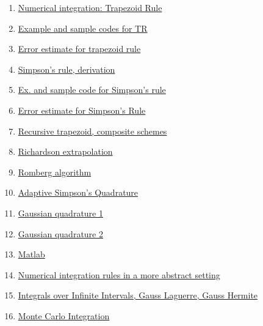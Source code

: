 \documentclass[11pt]{article}
\begin{document}
\begin{multicols}{2}
	\begin{enumerate}
		\item \href{https://mp.weixin.qq.com/s/n0nvErfrI6dky09jLMUrQw}{Numerical integration: Trapezoid Rule}	%
		\item \href{https://mp.weixin.qq.com/s/OZSXY4VVAWWYm0ZGQwIfSw}{Example and sample codes for TR}	%
		\item \href{https://mp.weixin.qq.com/s/HWJass--DbZm6p0k-g4L1w}{Error estimate for trapezoid rule}	%
		\item \href{https://mp.weixin.qq.com/s/27i-0YAAzpgSc4Mm9z_1kQ}{Simpson's rule, derivation}	%
		\item \href{https://mp.weixin.qq.com/s/pz0EkDTPP1SIh_ghAqp0wQ}{Ex. and sample code for Simpson's rule}	%
		\item \href{https://mp.weixin.qq.com/s/xxvjM123pQ8Krr2NnEMxoA}{Error estimate for Simpson's Rule}	%
		\item \href{https://mp.weixin.qq.com/s/hMED_ZgGRiBKk6JEov4eAA}{Recursive trapezoid, composite schemes}	%
		\item \href{https://mp.weixin.qq.com/s/5cQiy-CkeRIJ67hpuY_8XA}{Richardson extrapolation}	%
		\item \href{https://mp.weixin.qq.com/s/_zdSdK2JI_ZLCkutSbpR1A}{Romberg algorithm}	%
		\item \href{https://mp.weixin.qq.com/s/xV5PZp8vDpXRYFsuR46KbQ}{Adaptive Simpson's Quadrature}	%
		\item \href{https://mp.weixin.qq.com/s/jNlAtU4pNMvYs-ixW1TE6Q}{Gaussian quadrature 1}	%
		\item \href{https://mp.weixin.qq.com/s/xWZgQmc-pVxl8fWgi3iHUQ}{Gaussian quadrature 2}	%
		\item \href{https://mp.weixin.qq.com/s/5eDxwwn8L5M7nmOmEyk16w}{Matlab}	%
		\item \href{https://mp.weixin.qq.com/s/FYmE0A8-vO9wXnzK0GP_uQ}{Numerical integration rules in a more abstract setting}	%
		\item \href{https://mp.weixin.qq.com/s/f2HuxK0JO5lKGQuvFRnq2A}{Integrals over Infinite Intervals, Gauss Laguerre, Gauss Hermite}	%
		\item \href{https://mp.weixin.qq.com/s/ggjZNv1d9WSFa31VOaWdyg}{Monte Carlo Integration}	%
	\end{enumerate}
\end{multicols}

\vspace{-1cm}
\end{document}
